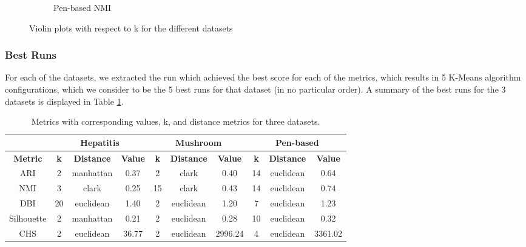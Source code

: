 \begin{figure}[H]
\begin{subfigure}{0.32\textwidth}
        \caption{Pen-based NMI}
    \end{subfigure}
    \caption{Violin plots with respect to k for the different datasets}
    \label{fig:kmeans:violin}
\end{figure}

\subsubsection{Best Runs}
For each of the datasets, we extracted the run which achieved the best score for each of the metrics, which results in 5 K-Means algorithm configurations, which we consider to be the 5 best runs for that dataset (in no particular order). A summary of the best runs for the 3 datasets is displayed in Table \ref{tab:kmeans:best_runs}.
\begin{table}[h!]
    \centering
    \begin{tabular}{|c|ccc|ccc|ccc|}
        \hline
                        & \multicolumn{3}{c|}{\textbf{Hepatitis}} & \multicolumn{3}{c|}{\textbf{Mushroom}} & \multicolumn{3}{c|}{\textbf{Pen-based}} \\ \hline
        \textbf{Metric} & \textbf{k} & \textbf{Distance} & \textbf{Value} 
                        & \textbf{k} & \textbf{Distance} & \textbf{Value} 
                        & \textbf{k} & \textbf{Distance} & \textbf{Value} \\ \hline
        ARI            & 2          & manhattan         & 0.37 
                       & 2          & clark         & 0.40 
                       & 14          & euclidean             & 0.64 \\ \hline
        NMI            & 3          & clark             & 0.25 
                       & 15          & clark         & 0.43 
                       & 14          & euclidean         & 0.74 \\ \hline
        DBI            & 20         & euclidean         & 1.40 
                       & 2         & euclidean             & 1.20 
                       & 7         & euclidean         & 1.23 \\ \hline
        Silhouette     & 2          & manhattan         & 0.21 
                       & 2          & euclidean         & 0.28 
                       & 10          & euclidean             & 0.32 \\ \hline
        CHS            & 2          & euclidean         & 36.77 
                       & 2          & euclidean         & 2996.24 
                       & 4          & euclidean         & 3361.02 \\ \hline
    \end{tabular}
    \caption{Metrics with corresponding values, k, and distance metrics for three datasets.}
    \label{tab:kmeans:best_runs}
\end{table}


